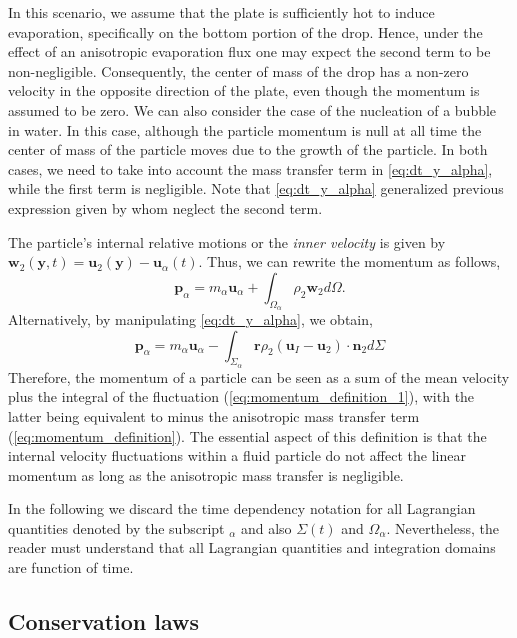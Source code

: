 In this scenario, we assume that the plate is sufficiently hot to induce evaporation, specifically on the bottom portion of the drop.
Hence, under the effect of an anisotropic evaporation flux one may expect the second term to be non-negligible.
Consequently, the center of mass of the drop has a non-zero velocity in the opposite direction of the plate, even though the momentum is assumed to be zero.
We can also consider the case of the nucleation of a bubble in water. 
In this case, although the particle momentum is null at all time the center of mass of the particle moves due to the growth of the particle. 
In both cases, we need to take into account the mass transfer term in \ref{eq:dt_y_alpha}, while the first term is negligible. 
Note that \ref{eq:dt_y_alpha} generalized previous expression given by \citet{morel2015mathematical} whom neglect the second term.

The particle's internal relative motions or the \textit{inner velocity} is given by $\textbf{w}_2(\textbf{y},t) = \textbf{u}_2(\textbf{y}) - \textbf{u}_\alpha(t)$.
Thus, we can rewrite the momentum as follows,
\begin{equation}
    \label{eq:momentum_definition_1}
    \textbf{p}_\alpha
    = m_\alpha \textbf{u}_\alpha
    + \int_{\Omega_\alpha} \rho_2 \textbf{w}_2 d\Omega.
\end{equation}
Alternatively, by manipulating \ref{eq:dt_y_alpha}, we obtain,
\begin{equation}
    \textbf{p}_\alpha
    =  m_\alpha \textbf{u}_\alpha
    - \int_{\Sigma_\alpha} \textbf{r} \rho_2 (\textbf{u}_I - \textbf{u}_2)\cdot \textbf{n}_2 d\Sigma
    \label{eq:momentum_definition}
\end{equation}
Therefore, the momentum of a particle can be seen as a sum of the mean velocity plus the integral of the fluctuation (\ref{eq:momentum_definition_1}), with the latter being equivalent to minus the anisotropic mass transfer term (\ref{eq:momentum_definition}).
The essential aspect of this definition is that the internal velocity fluctuations within a fluid particle do not affect the linear momentum as long as the anisotropic mass transfer is negligible.  

In the following we discard the time dependency notation for all Lagrangian quantities denoted by the subscript $_\alpha$ and also $\Sigma(t)$ and $\Omega_\alpha$.
Nevertheless, the reader must understand that all Lagrangian quantities and integration domains are function of time. 

\subsection{Conservation laws}

